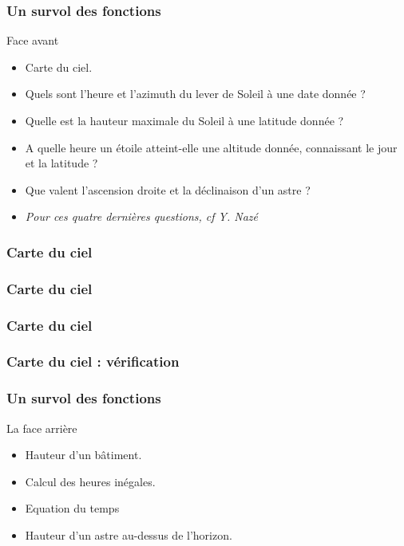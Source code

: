 \documentclass{beamer}
\begin{document}
\begin{frame}\frametitle{Un survol des fonctions}
\begin{block}{Face avant}
\begin{itemize}
\item Carte du ciel.
\item Quels sont l'heure et l'azimuth du lever de Soleil à une date donnée ? 
\item Quelle est la hauteur maximale du Soleil à une latitude donnée ? 
\item A quelle heure un étoile atteint-elle une altitude donnée, connaissant le jour et la latitude ? 
\item Que valent l'ascension droite et la déclinaison d'un astre ? 
\item {\em Pour ces quatre dernières questions, cf Y. Nazé}
\end{itemize}


\end{block}

   \end{frame}
   \begin{frame}\frametitle{Carte du ciel}
\begin{center}
\end{center}
   \end{frame}
   
   
      \begin{frame}\frametitle{Carte du ciel}
\begin{center}
\end{center}
   \end{frame}
 
 
    
        \begin{frame}\frametitle{Carte du ciel}
\begin{center}
\end{center}
   \end{frame}
   
   
\begin{frame}\frametitle{Carte du ciel : vérification}
\begin{center}
\end{center}
   \end{frame}
   \begin{frame}\frametitle{Un survol des fonctions}
   \begin{block}{La face arrière}
   \begin{itemize}
   \item Hauteur d'un bâtiment.
   \item Calcul des heures inégales. 
   \item Equation du temps
   \item Hauteur d'un astre au-dessus de l'horizon. 
   
   \end{itemize}
   
   \end{block}

   \end{frame}
   
\end{document}

